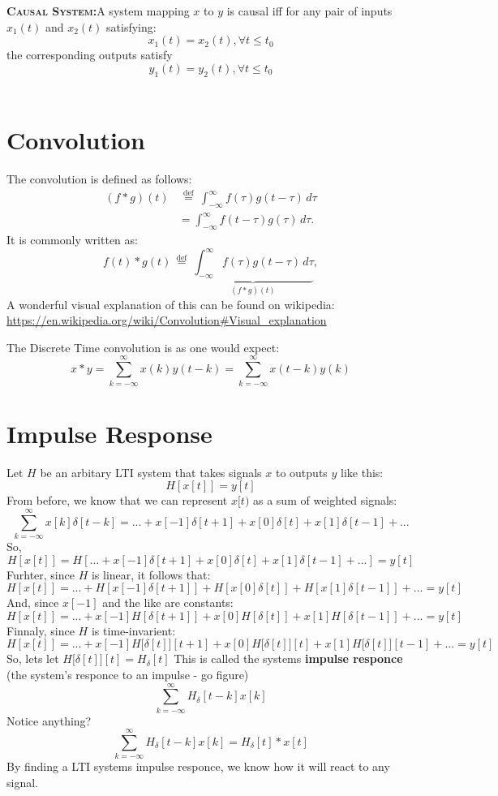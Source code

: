 \documentclass[a4paper,12pt]{article}
\newcommand{\define}[2]{\label{#1}\textbf{\textsc{#1:}}\quad#2\\}
\begin{document}
\define{Causal System}{A system mapping $x$ to $y$ is causal iff for any pair of inputs $x_1(t)$ and $x_2(t)$ satisfying:
$$x_1(t) = x_2(t), \forall t\leq t_0$$
the corresponding outputs satisfy
$$y_1(t) = y_2(t), \forall t\leq t_0$$}
\section{Convolution}
The convolution is defined as follows:
$${\displaystyle {\begin{aligned}(f*g)(t)&\,{\stackrel {\mathrm {def} }{=}}\ \int _{-\infty }^{\infty }f(\tau )g(t-\tau )\,d\tau \\&=\int _{-\infty }^{\infty }f(t-\tau )g(\tau )\,d\tau .\end{aligned}}}$$
	It is commonly written as:
$${\displaystyle f(t)*g(t)\,{\stackrel {\mathrm {def} }{=}}\ \underbrace {\int _{-\infty }^{\infty }f(\tau )g(t-\tau )\,d\tau } _{(f*g)(t)},}$$
A wonderful visual explanation of this can be found on wikipedia: \url{https://en.wikipedia.org/wiki/Convolution#Visual_explanation}

The Discrete Time convolution is as one would expect:
$$x*y=\sum_{k=-\infty}^\infty x(k)y(t-k)=\sum_{k=-\infty}^\infty x(t-k)y(k)$$
\section{Impulse Response}
Let $H$ be an arbitary LTI system that takes signals $x$ to outputs $y$ like this:
$$H[x[t]]=y[t]$$
From before, we know that we can represent $x[t)$ as a sum of weighted signals:
$$\sum_{k=-\infty}^\infty x[k]\delta[t-k]= ... + x[-1]\delta[t+1] + x[0]\delta[t] + x[1]\delta[t-1] + ... $$
So, 
$$H[x[t]]=H[... + x[-1]\delta[t+1] + x[0]\delta[t] + x[1]\delta[t-1] + ...] = y[t]$$
Furhter, since $H$ is linear, it follows that:
$$H[x[t]]= ... +H[ x[-1]\delta[t+1]] + H[x[0]\delta[t]] + H[x[1]\delta[t-1]] + ... = y[t]$$
And, since $x[-1]$ and the like are constants:
$$H[x[t]]= ... +x[-1]H[\delta[t+1]] + x[0]H[\delta[t]] + x[1]H[\delta[t-1]] + ... = y[t]$$
Finnaly, since $H$ is time-invarient:
$$H[x[t]]= ... +x[-1]H\Big[\delta[t]\Big][t+1] + x[0]H\Big[\delta[t]\Big][t] + x[1]H\Big[\delta[t]\Big][t-1] + ... = y[t]$$
So, lets let $H\Big[\delta[t]\Big][t] = H_\delta[t]$ This is called the systems \textbf{impulse responce} (the system's responce to an impulse - go figure)
$$\sum_{k=-\infty}^\infty H_\delta[t-k]x[k]$$
Notice anything?
$$\sum_{k=-\infty}^\infty H_\delta[t-k]x[k]=H_\delta[t]*x[t]$$
By finding a LTI systems impulse responce, we know how it will react to any signal. 
\end{document}
